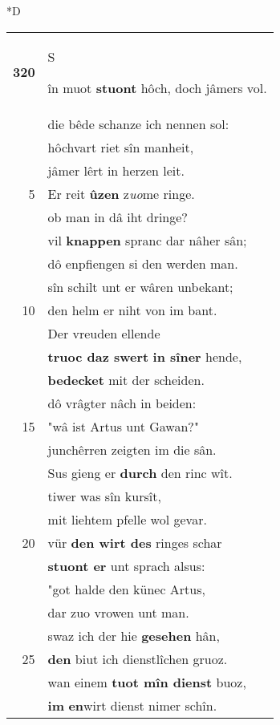 \documentclass[8pt,a4paper,notitlepage]{article}
\begin{document}
\begin{table}[ht]
\begin{minipage}[t]{0.5\linewidth}
\small
\begin{center}*D
\end{center}
\begin{tabular}{rl}
\textbf{320} & \begin{large}S\end{large}în muot \textbf{stuont} hôch, doch jâmers vol.\\ 
 & die bêde schanze ich nennen sol:\\ 
 & hôchvart riet sîn manheit,\\ 
 & jâmer lêrt in herzen leit.\\ 
5 & Er reit \textbf{ûzen} z\textit{uo}me ringe.\\ 
 & ob man in dâ iht dringe?\\ 
 & vil \textbf{knappen} spranc dar nâher sân;\\ 
 & dô enpfiengen si den werden man.\\ 
 & sîn schilt unt er wâren unbekant;\\ 
10 & den helm er niht von im bant.\\ 
 & Der vreuden ellende\\ 
 & \textbf{truoc daz swert} \textbf{in sîner} hende,\\ 
 & \textbf{bedecket} mit der scheiden.\\ 
 & dô vrâgter nâch in beiden:\\ 
15 & "wâ ist Artus unt Gawan?"\\ 
 & junchêrren zeigten im die sân.\\ 
 & Sus gieng er \textbf{durch} den rinc wît.\\ 
 & tiwer was sîn kursît,\\ 
 & mit liehtem pfelle wol gevar.\\ 
20 & vür \textbf{den wirt des} ringes schar\\ 
 & \textbf{stuont er} unt sprach alsus:\\ 
 & "got halde den künec Artus,\\ 
 & dar zuo vrowen unt man.\\ 
 & swaz ich der hie \textbf{gesehen} hân,\\ 
25 & \textbf{den} biut ich dienstlîchen gruoz.\\ 
 & wan einem \textbf{tuot mîn dienst} buoz,\\ 
 & \textbf{im} \textbf{en}wirt dienst nimer schîn.\\ 

\end{tabular}
\end{minipage}
\end{table}
\end{document}

